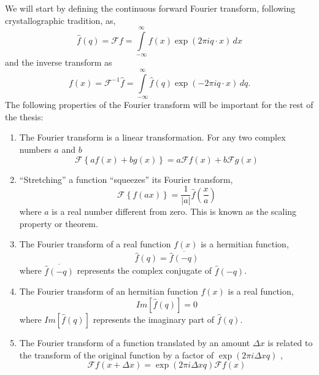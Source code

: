 We will start by defining the continuous forward Fourier transform, following crystallographic tradition, as,
\begin{equation}
\hat{f}(q) = \mathscr{F}f = \int \limits_{-\infty}^{\infty} 
f(x) \exp(2 \pi i q \cdot x) \, dx
\end{equation}
and the inverse transform as
\begin{equation}
f(x) = \mathscr{F}^{-1}\hat{f} = \int \limits_{-\infty}^{\infty} 
\hat{f}(q) \exp(-2 \pi i q \cdot x) \, dq.
\end{equation}
The following properties of the Fourier transform will be important for the rest of the thesis:
\begin{enumerate}
\item The Fourier transform is a linear transformation. For any two complex
  numbers $a$ and $b$
\begin{equation}
\mathscr{F}\left\{ a f(x) + b g(x)\right\} = a \mathscr{F}f(x) + b \mathscr{F}g(x)
\end{equation}

\item ``Stretching'' a function ``squeezes'' its Fourier  transform,
\begin{equation}
\mathscr{F}\left\{f(a x)\right\} = \frac{1}{|a|}\hat{f}(\frac{x}{a}) 
\end{equation}
where $a$ is a real number different from zero. This is known as the scaling
property or theorem.

\item The Fourier transform of a real function $f(x)$ is a hermitian function,  
\begin{equation}
\hat{f}(q) = \overline{\hat{f}(-q)}
\end{equation}
where $\overline{\hat{f}(-q)}$ represents the complex conjugate of $\hat{f}(-q)$.
\item The Fourier transform of an hermitian function $f(x)$ is a real function,
\begin{equation}
Im\left[\hat{f}(q)\right] = 0
\end{equation}
where $Im\left[\hat{f}(q)\right]$ represents the imaginary part of $\hat{f}(q)$.
\item The Fourier transform of a function translated by an amount $\Delta x$ is
  related to the transform of the original function by a factor of $\exp(2 \pi i
  \Delta x q)$ ,
  \begin{equation}
    \mathscr{F} f(x+\Delta x) = \exp(2 \pi i \Delta x q) \mathscr{F} f(x)
\end{equation}


\end{enumerate}
